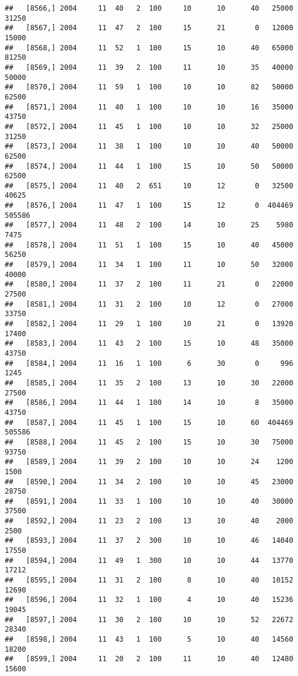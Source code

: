 \documentclass{article}\usepackage[]{graphicx}\usepackage[]{color}
\makeatletter
\newenvironment{kframe}{%
 \def\at@end@of@kframe{}%
 \ifinner\ifhmode%
  \def\at@end@of@kframe{\end{minipage}}%
  \begin{minipage}{\columnwidth}%
 \fi\fi%
 \def\FrameCommand##1{\hskip\@totalleftmargin \hskip-\fboxsep
 \colorbox{shadecolor}{##1}\hskip-\fboxsep
     \hskip-\linewidth \hskip-\@totalleftmargin \hskip\columnwidth}%
 \MakeFramed {\advance\hsize-\width
   \@totalleftmargin\z@ \linewidth\hsize
   \@setminipage}}%
 {\par\unskip\endMakeFramed%
 \at@end@of@kframe}
\newenvironment{knitrout}{}{} %
\makeatother
\begin{document}
\begin{knitrout}
\begin{kframe}
\begin{verbatim}
##   [8566,] 2004     11  40   2  100     10      10      40   25000   31250
##   [8567,] 2004     11  47   2  100     15      21       0   12000   15000
##   [8568,] 2004     11  52   1  100     15      10      40   65000   81250
##   [8569,] 2004     11  39   2  100     11      10      35   40000   50000
##   [8570,] 2004     11  59   1  100     10      10      82   50000   62500
##   [8571,] 2004     11  40   1  100     10      10      16   35000   43750
##   [8572,] 2004     11  45   1  100     10      10      32   25000   31250
##   [8573,] 2004     11  38   1  100     10      10      40   50000   62500
##   [8574,] 2004     11  44   1  100     15      10      50   50000   62500
##   [8575,] 2004     11  40   2  651     10      12       0   32500   40625
##   [8576,] 2004     11  47   1  100     15      12       0  404469  505586
##   [8577,] 2004     11  48   2  100     14      10      25    5980    7475
##   [8578,] 2004     11  51   1  100     15      10      40   45000   56250
##   [8579,] 2004     11  34   1  100     11      10      50   32000   40000
##   [8580,] 2004     11  37   2  100     11      21       0   22000   27500
##   [8581,] 2004     11  31   2  100     10      12       0   27000   33750
##   [8582,] 2004     11  29   1  100     10      21       0   13920   17400
##   [8583,] 2004     11  43   2  100     15      10      48   35000   43750
##   [8584,] 2004     11  16   1  100      6      30       0     996    1245
##   [8585,] 2004     11  35   2  100     13      10      30   22000   27500
##   [8586,] 2004     11  44   1  100     14      10       8   35000   43750
##   [8587,] 2004     11  45   1  100     15      10      60  404469  505586
##   [8588,] 2004     11  45   2  100     15      10      30   75000   93750
##   [8589,] 2004     11  39   2  100     10      10      24    1200    1500
##   [8590,] 2004     11  34   2  100     10      10      45   23000   28750
##   [8591,] 2004     11  33   1  100     10      10      40   30000   37500
##   [8592,] 2004     11  23   2  100     13      10      40    2000    2500
##   [8593,] 2004     11  37   2  300     10      10      46   14040   17550
##   [8594,] 2004     11  49   1  300     10      10      44   13770   17212
##   [8595,] 2004     11  31   2  100      8      10      40   10152   12690
##   [8596,] 2004     11  32   1  100      4      10      40   15236   19045
##   [8597,] 2004     11  30   2  100     10      10      52   22672   28340
##   [8598,] 2004     11  43   1  100      5      10      40   14560   18200
##   [8599,] 2004     11  20   2  100     11      10      40   12480   15600

\end{verbatim}
\end{kframe}
\end{knitrout}
\end{document}
